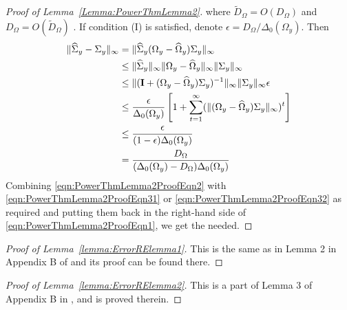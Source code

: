 \begin{proof}[Proof of Lemma~\ref{Lemma:PowerThmLemma2}]
%
where $\tilde D_\Omega = O(D_\Omega)$ and $D_\Omega = O(\tilde D_\Omega)$ \citep{BickelLevina08}. If condition (I) is satisfied, denote $\epsilon = D_\Omega / \Delta_0 (\Omega_y)$. Then
%
\begin{align}
\| \widehat \Sigma_y - \Sigma_y \|_\infty &= \| \widehat \Sigma_y (\Omega_y - \widehat \Omega_y) \Sigma_y \|_\infty \notag\\
& \leq \| \widehat \Sigma_y \|_\infty \| \Omega_y - \widehat \Omega_y \|_\infty
\| \Sigma_y \|_\infty \notag\\
& \leq \| ({\mathbf{I}} + (\Omega_y - \widehat \Omega_y) \Sigma_y)^{-1}\|_\infty \| \Sigma_y \|_\infty \epsilon \notag\\
& \leq \frac{\epsilon}{\Delta_0( \Omega_y)}
\left[ 1 + \sum_{t=1}^\infty (\| (\Omega_y - \widehat \Omega_y) \Sigma_y \|_\infty)^t \right] \notag\\
& \leq \frac{\epsilon}{(1- \epsilon) \Delta_0( \Omega_y)} \notag\\
& = \frac{D_\Omega}{(\Delta_0 (\Omega_y) - D_\Omega ) \Delta_0 (\Omega_y)}\label{eqn:PowerThmLemma2ProofEqn32}
\end{align}
%
Combining \eqref{eqn:PowerThmLemma2ProofEqn2} with \eqref{eqn:PowerThmLemma2ProofEqn31} or \eqref{eqn:PowerThmLemma2ProofEqn32} as required and putting them back in the right-hand side of \eqref{eqn:PowerThmLemma2ProofEqn1}, we get the needed.
\end{proof}

\begin{proof}[Proof of Lemma~\ref{lemma:ErrorRElemma1}]
This is the same as in Lemma 2 in Appendix B of \cite{LinEtal16} and its proof can be found there.
\end{proof}

\begin{proof}[Proof of Lemma~\ref{lemma:ErrorRElemma2}]
This is a part of Lemma 3 of Appendix B in \cite{LinEtal16}, and is proved therein.
\end{proof}